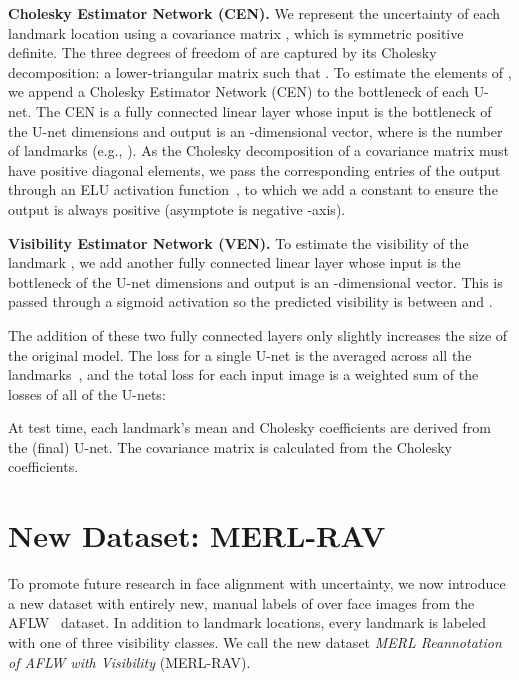 \documentclass[10pt,twocolumn,letterpaper]{article}
\newcommand{\example}{{e.g.}}
\newcommand{\ourdataset}{MERL-RAV}
\newcommand{\ourdatasetHeading}{MERL-RAV}
\newcommand{\1}{{\bf 1}}
\newcommand{\0}{{\bf 0}}
\begin{document}
        \textbf{Cholesky Estimator Network (CEN).} We represent the uncertainty of each landmark location using a  covariance matrix , which is symmetric positive definite. The three degrees of freedom of  are captured by its Cholesky decomposition: a lower-triangular matrix  such that . To estimate the elements of , we append a Cholesky Estimator Network (CEN) to the bottleneck of each U-net. The CEN is a fully connected linear layer whose input is the bottleneck of the U-net  dimensions and output is an -dimensional vector, where  is the number of landmarks (\example, ). As the Cholesky decomposition  of a covariance matrix must have positive diagonal elements, we pass the corresponding entries of the output through an ELU activation function~\cite{clevert2015fast}, to which we add a constant to ensure the output is always positive (asymptote is negative -axis). 
        
        \textbf{Visibility Estimator Network (VEN).} To estimate the visibility of the landmark , we add another fully connected linear layer whose input is the bottleneck of the U-net  dimensions and output is an  -dimensional vector. This is passed through a sigmoid activation so the predicted visibility  is between  and . 

        The addition of these two fully connected layers only slightly increases the size of the original model. The loss for a single U-net is the averaged  across all the landmarks \,, and the total loss  for each input image is a weighted sum of the losses of all  of the U-nets:
        
        At test time, each landmark's mean and Cholesky coefficients are derived from the  (final) U-net. The covariance matrix is calculated from the Cholesky coefficients.


\vspace{-0.2cm}
\section{New Dataset: \ourdatasetHeading}
\vspace{-0.15cm}
    To promote future research in face alignment with uncertainty, we now introduce a new dataset with entirely new, manual labels of over  face images from the AFLW~\cite{koestinger2011annotated} dataset. In addition to landmark locations, every landmark is labeled with one of three visibility classes. We call the new dataset {\em MERL Reannotation of AFLW with Visibility} (\ourdataset).
    
\end{document}
